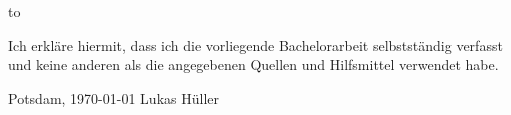 \thispagestyle{empty}
\vspace*{24\baselineskip}
\hbox to \textwidth{\hrulefill}
\par
Ich erkläre hiermit, dass ich die vorliegende Bachelorarbeit selbstständig verfasst und keine anderen als die angegebenen Quellen und Hilfsmittel verwendet habe.

Potsdam, {\today}
\newline
\newline
\newline
\newline
\newline
Lukas Hüller

\clearpage